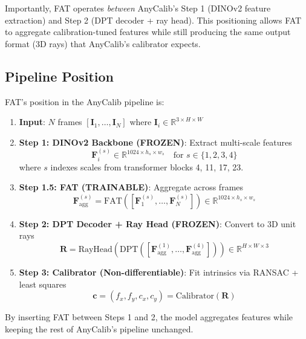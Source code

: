 Importantly, FAT operates \emph{between} AnyCalib's Step 1 (DINOv2 feature extraction) and Step 2 (DPT decoder + ray head). This positioning allows FAT to aggregate calibration-tuned features while still producing the same output format (3D rays) that AnyCalib's calibrator expects.

\subsection{Pipeline Position}

FAT's position in the AnyCalib pipeline is:

\begin{enumerate}
    \item \textbf{Input}: $N$ frames $[\mathbf{I}_1, \ldots, \mathbf{I}_N]$ where $\mathbf{I}_i \in \mathbb{R}^{3 \times H \times W}$
    \item \textbf{Step 1: DINOv2 Backbone (FROZEN)}: Extract multi-scale features
    \begin{equation}
        \mathbf{F}_i^{(s)} \in \mathbb{R}^{1024 \times h_s \times w_s} \quad \text{for } s \in \{1,2,3,4\}
    \end{equation}
    where $s$ indexes scales from transformer blocks 4, 11, 17, 23.
    \item \textbf{Step 1.5: FAT (TRAINABLE)}: Aggregate across frames
    \begin{equation}
        \mathbf{F}^{(s)}_{\text{agg}} = \text{FAT}([\mathbf{F}_1^{(s)}, \ldots, \mathbf{F}_N^{(s)}]) \in \mathbb{R}^{1024 \times h_s \times w_s}
    \end{equation}
    \item \textbf{Step 2: DPT Decoder + Ray Head (FROZEN)}: Convert to 3D unit rays
    \begin{equation}
        \mathbf{R} = \text{RayHead}(\text{DPT}([\mathbf{F}^{(1)}_{\text{agg}}, \ldots, \mathbf{F}^{(4)}_{\text{agg}}])) \in \mathbb{R}^{H \times W \times 3}
    \end{equation}
    \item \textbf{Step 3: Calibrator (Non-differentiable)}: Fit intrinsics via RANSAC + least squares
    \begin{equation}
        \mathbf{c} = (f_x, f_y, c_x, c_y) = \text{Calibrator}(\mathbf{R})
    \end{equation}
\end{enumerate}

By inserting FAT between Steps 1 and 2, the model aggregates features while keeping the rest of AnyCalib's pipeline unchanged.

